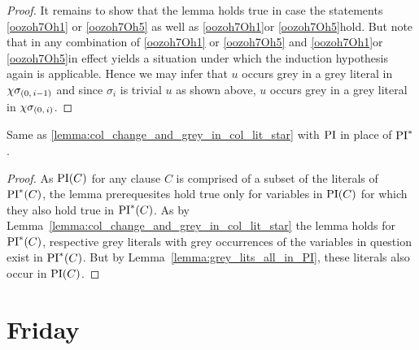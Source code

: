 \documentclass[,%
	draft=false,%
	numbers=noendperiod
	12pt,
	a4paper,
	oneside,%
	openany,
]{memoir}
\newcommand{\inv}{\ensuremath{\chi}}
\begin{document}
\begin{proof}
	It remains to show that the lemma holds true in case the statements \ref{oozoh7Oh1} or \ref{oozoh7Oh5} as well as \ref{oozoh7Oh1}\othercase or \ref{oozoh7Oh5}\othercase hold.
	But note that in any combination of \ref{oozoh7Oh1} or \ref{oozoh7Oh5} and \ref{oozoh7Oh1}\othercase or \ref{oozoh7Oh5}\othercase in effect yields a situation under which the induction hypothesis again is applicable.
	Hence we may infer that $u$ occurs grey in a grey literal in $\inv\sigmazmi$ and since $\sigma_i$ is trivial $u$ as shown above, $u$ occurs grey in a grey literal in $\inv\sigmazi$.
\end{proof}

\begin{lemma}
	\label{lemma:col_change_and_grey_in_col_lit}
	Same as \ref{lemma:col_change_and_grey_in_col_lit_star} with $\operatorname{PI}$ in place of $\operatorname{PI}^*$.
\end{lemma}
\begin{proof}
	As $\operatorname{PI}(C)$ for any clause $C$ is comprised of a subset of the literals of $\operatorname{PI}^*(C)$, the lemma prerequesites hold true only for variables in $\operatorname{PI}(C)$ for which they also hold true in $\operatorname{PI}^*(C)$.
	As by Lemma~\ref{lemma:col_change_and_grey_in_col_lit_star} the lemma holds for $\operatorname{PI}^*(C)$, respective grey literals with grey occurrences of the variables in question exist in $\operatorname{PI}^*(C)$.
	But by Lemma~\ref{lemma:grey_lits_all_in_PI}, these literals also occur in $\operatorname{PI}(C)$.
\end{proof}


\section{Friday}
\end{document}
